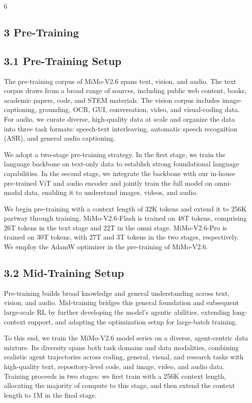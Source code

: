\documentclass[
  10
]{article}
\begin{document}
6

\subsection{3 Pre-Training}\label{pre-training}

\subsection{3.1 Pre-Training Setup}\label{pre-training-setup}

The pre-training corpus of MiMo-V2.6 spans text, vision, and audio. The
text corpus draws from a broad range of sources, including public web
content, books, academic papers, code, and STEM materials. The vision
corpus includes image-captioning, grounding, OCR, GUI, conversation,
video, and visual-coding data. For audio, we curate diverse,
high-quality data at scale and organize the data into three task
formats: speech-text interleaving, automatic speech recognition (ASR),
and general audio captioning.

We adopt a two-stage pre-training strategy. In the first stage, we train
the language backbone on text-only data to establish strong foundational
language capabilities. In the second stage, we integrate the backbone
with our in-house pre-trained ViT and audio encoder and jointly train
the full model on omni-modal data, enabling it to understand images,
videos, and audio.

We begin pre-training with a context length of 32K tokens and extend it
to 256K partway through training. MiMo-V2.6-Flash is trained on 48T
tokens, comprising 26T tokens in the text stage and 22T in the omni
stage. MiMo-V2.6-Pro is trained on 30T tokens, with 27T and 3T tokens in
the two stages, respectively. We employ the AdamW optimizer in the
pre-training of MiMo-V2.6.

\subsection{3.2 Mid-Training Setup}\label{mid-training-setup}

Pre-training builds broad knowledge and general understanding across
text, vision, and audio. Mid-training bridges this general foundation
and subsequent large-scale RL by further developing the model's agentic
abilities, extending long-context support, and adapting the optimization
setup for large-batch training.

To this end, we train the MiMo-V2.6 model series on a diverse,
agent-centric data mixture. Its diversity spans both task domains and
data modalities, combining realistic agent trajectories across coding,
general, visual, and research tasks with high-quality text,
repository-level code, and image, video, and audio data. Training
proceeds in two stages: we first train with a 256K context length,
allocating the majority of compute to this stage, and then extend the
context length to 1M in the final stage.
\end{document}
